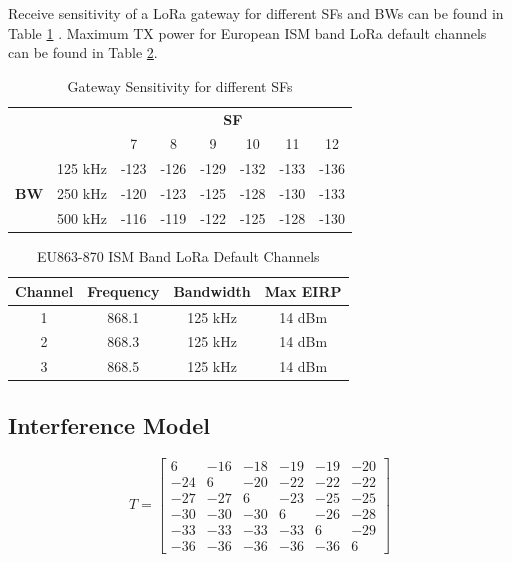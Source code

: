 \documentclass[conference]{IEEEtran}
\begin{document}
\par Receive sensitivity of a LoRa gateway for different SFs and BWs can be found in Table \ref{table:gw_sf_sensitivity} \cite{SX1276}. Maximum TX power for European ISM band LoRa default channels can be found in Table \ref{table:max_tx_power}.

\begin{table}
\centering
\caption{Gateway Sensitivity for different SFs}
\label{table:gw_sf_sensitivity}
\begin{tabular}{|c|c|c|c|c|c|c|c|}
\hline
            &         & \multicolumn{6}{c|}{\textbf{SF}}        \\ \cline{3-8} 
            &         &    7 &    8 &    9 &   10 &   11 &   12 \\ \hline
            & 125 kHz & -123 & -126 & -129 & -132 & -133 & -136 \\ 
\textbf{BW} & 250 kHz & -120 & -123 & -125 & -128 & -130 & -133 \\
            & 500 kHz & -116 & -119 & -122 & -125 & -128 & -130 \\
\hline
\end{tabular}
\end{table}


\begin{table}
\centering
\caption{EU863-870 ISM Band LoRa Default Channels}
\label{table:max_tx_power}
\begin{tabular}{|c|c|c|c|}
\hline
\textbf{Channel} & \textbf{Frequency} & \textbf{Bandwidth} & \textbf{Max EIRP} \\ \hline
      1 &     868.1 &   125 kHz &   14 dBm \\
      2 &     868.3 &   125 kHz &   14 dBm \\
      3 &     868.5 &   125 kHz &   14 dBm \\

\hline
\end{tabular}
\end{table}

\subsection{Interference Model}
\par [TODO]

\begin{equation} \label{eq:sinr}
T = \begin{bmatrix}
       6 & -16 & -18 & -19 & -19 & -20 \\
     -24 &   6 & -20 & -22 & -22 & -22 \\
     -27 & -27 &   6 & -23 & -25 & -25 \\
     -30 & -30 & -30 &   6 & -26 & -28 \\
     -33 & -33 & -33 & -33 &   6 & -29 \\
     -36 & -36 & -36 & -36 & -36 &   6
     \end{bmatrix}
\end{equation}
\end{document}
